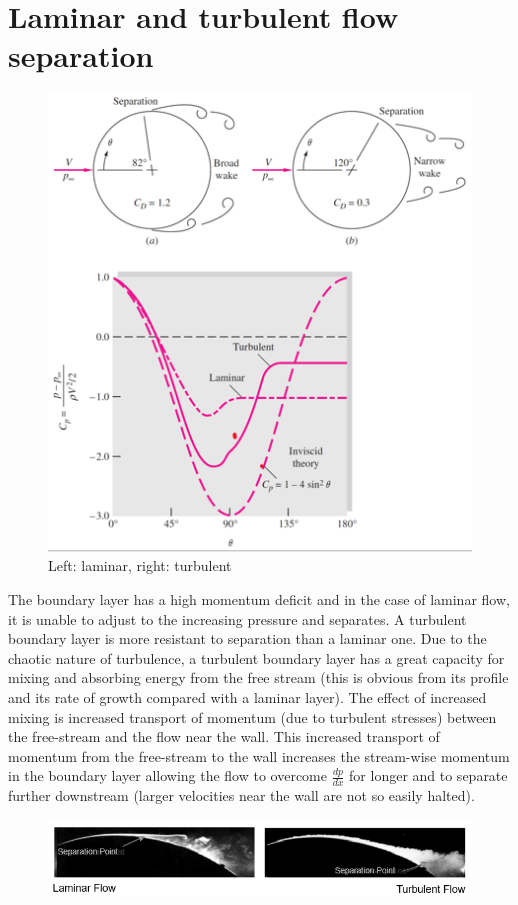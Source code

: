 \documentclass[class=report, crop=false, 12pt,a4paper]{standalone}
\begin{document}
\section{Laminar and turbulent flow separation}
\begin{figure}[H]
  \centering
  \includegraphics[width = 0.6 \textwidth]{../img/diagram54.png}
  \caption{Left: laminar, right: turbulent}
\end{figure}
The boundary layer has a high momentum deficit and in the case of laminar flow, it is unable to adjust to the increasing pressure and separates. A turbulent boundary layer is more resistant to separation than a laminar one. Due to the chaotic nature of turbulence, a turbulent boundary layer has a great capacity for mixing and absorbing energy from the free stream (this is obvious from its profile and its rate of growth compared with a laminar layer). The effect of increased mixing is increased transport of momentum (due to turbulent stresses) between the free-stream and the flow near the wall. This increased transport of momentum from the free-stream to the wall increases the stream-wise momentum in the boundary layer allowing the flow to overcome $\frac{dp}{dx}$ for longer and to separate further downstream (larger velocities near the wall are not so easily halted). 
\begin{figure}[H]
  \centering
  \includegraphics[width = \textwidth]{../img/diagram55.png}
\end{figure}
\end{document}
